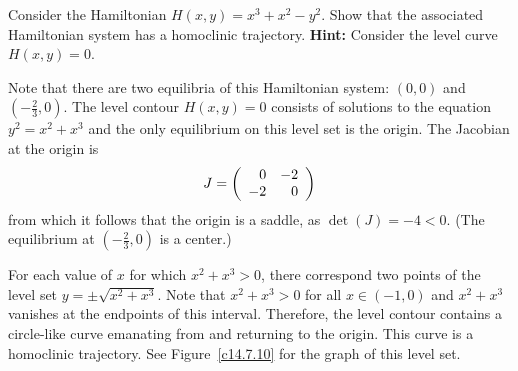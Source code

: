 \documentclass{ximera}
\begin{document}
\begin{exercise} \label{c14.7.10}
Consider the Hamiltonian  $H(x,y) = x^3 + x^2 - y^2$.  Show that the 
associated Hamiltonian system has a homoclinic trajectory.  {\bf Hint:} 
Consider the level curve $H(x,y)=0$.

\begin{solution}

Note that there are two equilibria of this Hamiltonian system: $(0,0)$ and
$(-\frac{2}{3},0)$.  The level contour $H(x,y)=0$ consists of solutions to 
the equation $y^2=x^2+x^3$ and the only equilibrium on this level set is the
origin.  The Jacobian at the origin is
\[
J = \left(\begin{array}{rr} 0 & -2\\ -2 &0\end{array}\right)
\]
from which it follows that the origin is a saddle, as $\det(J)=-4<0$. (The
equilibrium at $(-\frac{2}{3},0)$ is a center.)

For each value of $x$ for which $x^2+x^3>0$, there correspond two points of
the level set $y=\pm\sqrt{x^2+x^3}$.  Note that $x^2+x^3>0$ for all 
$x\in(-1,0)$ and $x^2+x^3$ vanishes at the endpoints of this interval. 
Therefore, the level contour contains a circle-like curve emanating from and
returning to the origin.  This curve is a homoclinic trajectory.  See
Figure~\ref{c14.7.10} for the graph of this level set.
 
\begin{figure}[htb]
     \centerline{%
     }
\end{figure} 

\end{solution}
\end{exercise}
\end{document}
